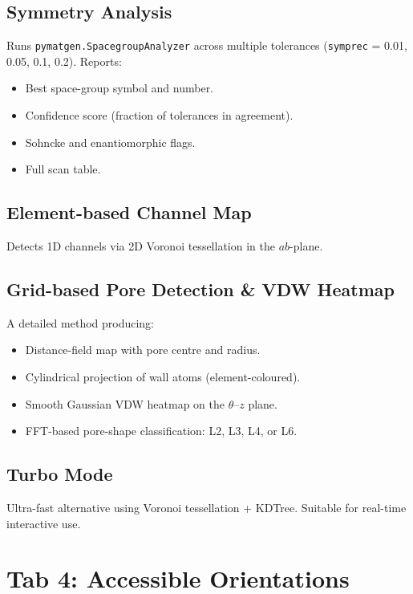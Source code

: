 \documentclass[11pt,a4paper]{article}
\begin{document}
\subsection{Symmetry Analysis}

Runs \texttt{pymatgen.SpacegroupAnalyzer} across multiple tolerances
(\texttt{symprec} = 0.01, 0.05, 0.1, 0.2).  Reports:

\begin{itemize}
    \item Best space-group symbol and number.
    \item Confidence score (fraction of tolerances in agreement).
    \item Sohncke and enantiomorphic flags.
    \item Full scan table.
\end{itemize}

\subsection{Element-based Channel Map}

Detects 1D channels via 2D Voronoi tessellation in the $ab$-plane.

\subsection{Grid-based Pore Detection \& VDW Heatmap}

A detailed method producing:

\begin{itemize}
    \item Distance-field map with pore centre and radius.
    \item Cylindrical projection of wall atoms (element-coloured).
    \item Smooth Gaussian VDW heatmap on the $\theta$--$z$ plane.
    \item FFT-based pore-shape classification: L2, L3, L4, or L6.
\end{itemize}

\subsection{Turbo Mode}

Ultra-fast alternative using Voronoi tessellation + KDTree.  Suitable for
real-time interactive use.

\section{Tab 4: Accessible Orientations}
\end{document}
